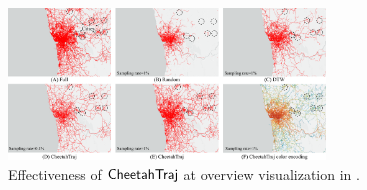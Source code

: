 \begin{figure}[t]
	\centering
	\includegraphics[width=0.75\textwidth]{pictures/case_study_icde/case_study_overview.pdf}
	\trim
	\caption{Effectiveness of $\mathsf{CheetahTraj}$ at overview visualization in \pt{}.}
	\label{fig:overview}
	\trim \trim
\end{figure}
\fi

